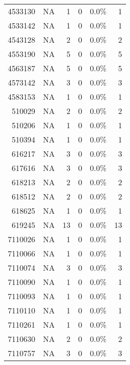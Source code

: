 \begin{longtable}{lrrrrr}
	\multicolumn{1}{r}{4533130} & NA    & 1     & 0     & 0.0\% & 1 \\
	\multicolumn{1}{r}{4533142} & NA    & 1     & 0     & 0.0\% & 1 \\
	\multicolumn{1}{r}{4543128} & NA    & 2     & 0     & 0.0\% & 2 \\
	\multicolumn{1}{r}{4553190} & NA    & 5     & 0     & 0.0\% & 5 \\
	\multicolumn{1}{r}{4563187} & NA    & 5     & 0     & 0.0\% & 5 \\
	\multicolumn{1}{r}{4573142} & NA    & 3     & 0     & 0.0\% & 3 \\
	\multicolumn{1}{r}{4583153} & NA    & 1     & 0     & 0.0\% & 1 \\
	\multicolumn{1}{r}{510029} & NA    & 2     & 0     & 0.0\% & 2 \\
	\multicolumn{1}{r}{510206} & NA    & 1     & 0     & 0.0\% & 1 \\
	\multicolumn{1}{r}{510394} & NA    & 1     & 0     & 0.0\% & 1 \\
	\multicolumn{1}{r}{616217} & NA    & 3     & 0     & 0.0\% & 3 \\
	\multicolumn{1}{r}{617616} & NA    & 3     & 0     & 0.0\% & 3 \\
	\multicolumn{1}{r}{618213} & NA    & 2     & 0     & 0.0\% & 2 \\
	\multicolumn{1}{r}{618512} & NA    & 2     & 0     & 0.0\% & 2 \\
	\multicolumn{1}{r}{618625} & NA    & 1     & 0     & 0.0\% & 1 \\
	\multicolumn{1}{r}{619245} & NA    & 13    & 0     & 0.0\% & 13 \\
	\multicolumn{1}{r}{7110026} & NA    & 1     & 0     & 0.0\% & 1 \\
	\multicolumn{1}{r}{7110066} & NA    & 1     & 0     & 0.0\% & 1 \\
	\multicolumn{1}{r}{7110074} & NA    & 3     & 0     & 0.0\% & 3 \\
	\multicolumn{1}{r}{7110090} & NA    & 1     & 0     & 0.0\% & 1 \\
	\multicolumn{1}{r}{7110093} & NA    & 1     & 0     & 0.0\% & 1 \\
	\multicolumn{1}{r}{7110110} & NA    & 1     & 0     & 0.0\% & 1 \\
	\multicolumn{1}{r}{7110261} & NA    & 1     & 0     & 0.0\% & 1 \\
	\multicolumn{1}{r}{7110630} & NA    & 2     & 0     & 0.0\% & 2 \\
	\multicolumn{1}{r}{7110757} & NA    & 3     & 0     & 0.0\% & 3 \\

\end{longtable}
